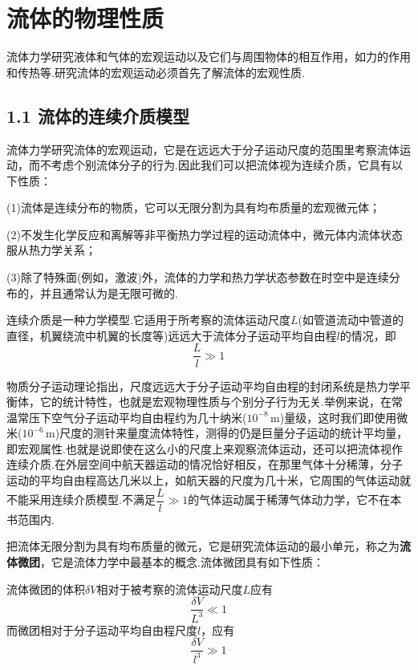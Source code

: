 \chapter{流体的物理性质}

流体力学研究液体和气体的宏观运动以及它们与周围物体的相互作用，如力的作用和传热等.研究流体的宏观运动必须首先了解流体的宏观性质.

\section*{1.1  流体的连续介质模型}

流体力学研究流体的宏观运动，它是在远远大于分子运动尺度的范围里考察流体运动，而不考虑个别流体分子的行为.因此我们可以把流体视为连续介质，它具有以下性质：

(1)流体是连续分布的物质，它可以无限分割为具有均布质量的宏观微元体；

(2)不发生化学反应和离解等非平衡热力学过程的运动流体中，微元体内流体状态服从热力学关系；

(3)除了特殊面(例如，激波)外，流体的力学和热力学状态参数在时空中是连续分布的，并且通常认为是无限可微的.

连续介质是一种力学模型.它适用于所考察的流体运动尺度$L$(如管道流动中管道的直径，机翼绕流中机翼的长度等)远远大于流体分子运动平均自由程$l$的情况，即
\begin{equation*}
\frac{L}{l}\gg 1
\tag{1.1}
\end{equation*}

物质分子运动理论指出，尺度远远大于分子运动平均自由程的封闭系统是热力学平衡体，它的统计特性，也就是宏观物理性质与个别分子行为无关.举例来说，在常温常压下空气分子运动平均自由程约为几十纳米($10^{-8}\,$m)量级，这时我们即使用微米($10^{-6}\,$m)尺度的测针来量度流体特性，测得的仍是巨量分子运动的统计平均量，即宏观属性.也就是说即使在这么小的尺度上来观察流体运动，还可以把流体视作连续介质.在外层空间中航天器运动的情况恰好相反，在那里气体十分稀薄，分子运动的平均自由程高达几米以上，如航天器的尺度为几十米，它周围的气体运动就不能采用连续介质模型.不满足$\dfrac{L}{l}\gg 1$的气体运动属于稀薄气体动力学，它不在本书范围内.

把流体无限分割为具有均布质量的微元，它是研究流体运动的最小单元，称之为\textbf{流体微团}，它是流体力学中最基本的概念.流体微团具有如下性质：

流体微团的体积$\delta V$相对于被考察的流体运动尺度$L$应有
\[
\frac{\delta V}{L^{3}}\ll 1
\]
而微团相对于分子运动平均自由程尺度$l$，应有
\[
\frac{\delta V}{l^{3}}\gg 1
\]

